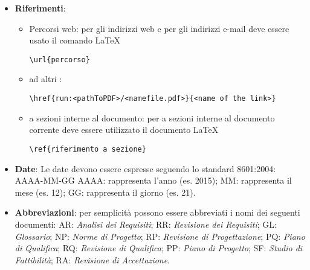 \documentclass{scalatekids-article}
\begin{document}
\begin{itemize}
    \item \textbf{Riferimenti}:
        \begin{itemize}
            \item Percorsi web: per gli indirizzi web e per gli indirizzi e-mail deve essere usato il comando \LaTeX\xspace
                \begin{center}
                    \verb=\url{percorso}=
                \end{center}
            \item {} ad altri :
                \begin{center}
                    \verb=\href{run:<pathToPDF>/<namefile.pdf>}{<name of the link>}=
                \end{center}
            \item {} a sezioni interne al documento: per  a sezioni interne al documento corrente deve essere utilizzato il documento \LaTeX\xspace
                \begin{center}
                    \verb=\ref{riferimento a sezione}=
                \end{center}
        \end{itemize}
    \item \textbf{Date}: Le date devono essere espresse seguendo lo standard \textit{} 8601:2004:
        AAAA-MM-GG
        AAAA: rappresenta l'anno (es. 2015);
        MM:	rappresenta il mese (es. 12);
        GG: rappresenta il giorno (es. 21).

    \item \textbf{Abbreviazioni}: per semplicità possono essere abbreviati i nomi dei seguenti documenti:
        AR: \textit{Analisi dei Requisiti};
        RR: \textit{Revisione dei Requisiti};
        GL: \textit{Glossario};
        NP: \textit{Norme di Progetto};
        RP: \textit{Revisione di Progettazione};
        PQ: \textit{Piano di Qualifica};
        RQ: \textit{Revisione di Qualifica};
        PP: \textit{Piano di Progetto};
        SF: \textit{Studio di Fattibilità};
        RA: \textit{Revisione di Accettazione}.


\end{itemize}
\end{document}
